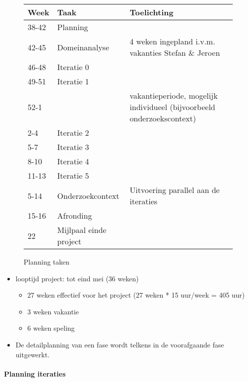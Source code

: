 \begin{figure}[h]
\begin{tabular}{llp{7cm}}\hline
{\bf Week}    & {\bf Taak}  & {\bf Toelichting}\\\hline
38-42         & Planning    \\
42-45         & Domeinanalyse & 4 weken ingepland i.v.m. vakanties Stefan \& Jeroen \\
46-48         & Iteratie 0    \\
49-51         & Iteratie 1    \\
52-1          &               & vakantieperiode, mogelijk
				individueel (bijvoorbeeld onderzoekscontext) \\
2-4           & Iteratie 2    \\
5-7           & Iteratie 3    \\
8-10          & Iteratie 4    \\
11-13         & Iteratie 5    \\

5-14          & Onderzoekcontext & Uitvoering parallel aan de iteraties \\
15-16         & Afronding     \\

22            & Mijlpaal einde project
\end{tabular}
\caption{Planning taken}
\end{figure}






\begin{itemize}
 \item looptijd project: tot eind mei (36 weken)
 \begin{itemize}
  \item 27 weken effectief voor het project  (27 weken * 15 uur/week = 405 uur)
  \item 3 weken vakantie
  \item 6 weken speling
 \end{itemize}
 \item De detailplanning van een fase wordt telkens in de voorafgaande fase uitgewerkt.
\end{itemize}



\paragraph{Planning iteraties}

